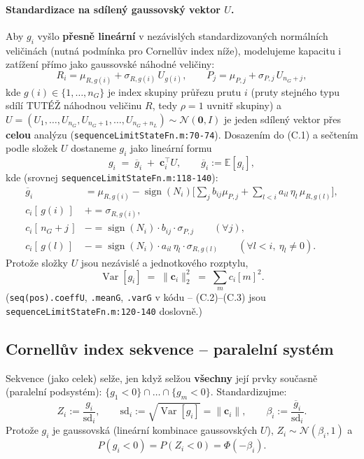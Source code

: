 \documentclass[11pt,a4paper]{article}
\newcommand{\code}[1]{\texttt{#1}}
\newcommand{\Var}{\operatorname{Var}}
\begin{document}
\paragraph{Standardizace na sdílený gaussovský vektor $U$.} Aby $g_i$ vyšlo \textbf{přesně lineární}
v nezávislých standardizovaných normálních veličinách (nutná podmínka pro Cornellův index níže),
modelujeme kapacitu i zatížení přímo jako gaussovské náhodné veličiny:
\[
  R_i = \mu_{R,g(i)} + \sigma_{R,g(i)}\,U_{g(i)}, \qquad P_j = \mu_{P,j} + \sigma_{P,j}\,U_{n_G+j},
\]
kde $g(i)\in\{1,\dots,n_G\}$ je index skupiny průřezu prutu $i$ (pruty stejného typu sdílí TUTÉŽ
náhodnou veličinu $R$, tedy $\rho=1$ uvnitř skupiny) a
$U=(U_1,\dots,U_{n_G},U_{n_G+1},\dots,U_{n_G+n_L})\sim\mathcal N(\mathbf 0,I)$ je jeden sdílený vektor
přes \textbf{celou} analýzu (\code{sequenceLimitStateFn.m:70-74}). Dosazením do (C.1) a sečtením podle
složek $U$ dostaneme $g_i$ jako lineární formu
\[
  g_i \;=\; \overline g_i \;+\; \mathbf c_i^\top U, \qquad \overline g_i:=\mathbb E[g_i],
\]
kde (srovnej \code{sequenceLimitStateFn.m:118-140}):
\[
\begin{aligned}
  \overline g_i &= \mu_{R,g(i)} - \operatorname{sign}(N_i)\Big[\sum_j b_{ij}\mu_{P,j}
        + \sum_{l<i} a_{il}\,\eta_l\,\mu_{R,g(l)}\Big], \\[4pt]
  c_i[\,g(i)\,] &\mathrel{+}= \sigma_{R,g(i)}, \\
  c_i[\,n_G+j\,] &\mathrel{-}= \operatorname{sign}(N_i)\cdot b_{ij}\cdot\sigma_{P,j} \qquad(\forall j),\\
  c_i[\,g(l)\,] &\mathrel{-}= \operatorname{sign}(N_i)\cdot a_{il}\,\eta_l\cdot\sigma_{R,g(l)}
        \qquad(\forall l<i,\ \eta_l\neq0).
\end{aligned}
\tag{C.2}
\]
Protože složky $U$ jsou nezávislé a jednotkového rozptylu,
\[
  \Var[g_i] \;=\; \|\mathbf c_i\|_2^2 \;=\; \sum_m c_i[m]^2. \tag{C.3}
\]
(\code{seq(pos).coeffU}, \code{.meanG}, \code{.varG} v kódu -- (C.2)--(C.3) jsou \code{sequenceLimitStateFn.m:120-140}
doslovně.)

\subsection{Cornellův index sekvence -- paralelní systém}
\label{sec:c2}

Sekvence (jako celek) selže, jen když selžou \textbf{všechny} její prvky současně (paralelní podsystém):
$\{g_1<0\}\cap\dots\cap\{g_m<0\}$. Standardizujme:
\[
  Z_i := \frac{g_i}{\mathrm{sd}_i},\qquad \mathrm{sd}_i := \sqrt{\Var[g_i]} = \|\mathbf c_i\|,
  \qquad \beta_i := \frac{\overline g_i}{\mathrm{sd}_i}.
\]
Protože $g_i$ je gaussovská (lineární kombinace gaussovských $U$), $Z_i\sim\mathcal N(\beta_i,1)$ a
\[
  P(g_i<0) = P(Z_i<0) = \Phi(-\beta_i).
\]
\end{document}

